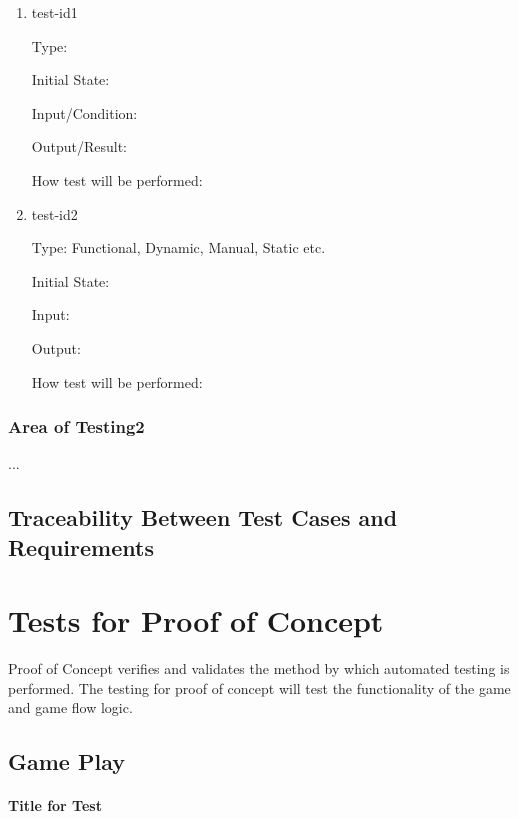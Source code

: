 \documentclass[12pt, titlepage]{article}
\begin{document}
\begin{enumerate}

\item{test-id1\\}

Type: 
					
Initial State: 
					
Input/Condition: 
					
Output/Result: 
					
How test will be performed: 
					
\item{test-id2\\}

Type: Functional, Dynamic, Manual, Static etc.
					
Initial State: 
					
Input: 
					
Output: 
					
How test will be performed: 

\end{enumerate}

\subsubsection{Area of Testing2}

...

\subsection{Traceability Between Test Cases and Requirements}

\section{Tests for Proof of Concept}

Proof of Concept verifies and validates the method by which automated testing is performed. The testing for proof of concept will test the functionality of the game and game flow logic. 

\subsection{Game Play}
		
\paragraph{Title for Test}
\end{document}
